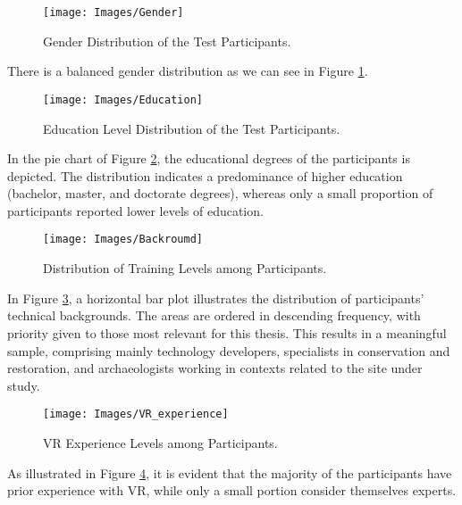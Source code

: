 \begin{figure}[h!]
    \centering
    \texttt{[image: Images/Gender]}
    \caption{Gender Distribution of the Test Participants.} 
    \label{fig:gender}
\end{figure}

There is a balanced gender distribution as we can see in Figure \ref{fig:gender}.

\begin{figure}[h!]
    \centering
    \texttt{[image: Images/Education]}
    \caption{Education Level Distribution of the Test Participants.} 
    \label{fig:education}
\end{figure}

In the pie chart of Figure \ref{fig:education}, the educational degrees of the participants is depicted. 
The distribution indicates a predominance of higher education (bachelor, master, and doctorate degrees), whereas only a small proportion of participants reported lower levels of education.


\begin{figure}[h!]
    \centering
    \texttt{[image: Images/Backroumd]}
    \caption{Distribution of Training Levels among Participants.} 
    \label{fig:background}
\end{figure}

In Figure \ref{fig:background}, a horizontal bar plot illustrates the distribution of participants’ technical backgrounds. 
The areas are ordered in descending frequency, with priority given to those most relevant for this thesis. 
This results in a meaningful sample, comprising mainly technology developers, specialists in conservation and restoration, and archaeologists working in contexts related to the site under study.

\begin{figure}[h!]
    \centering
    \texttt{[image: Images/VR\_experience]}
    \caption{\gls{VR} Experience Levels among Participants.} 
    \label{fig:VR_experience}
\end{figure}

As illustrated in Figure \ref{fig:VR_experience}, it is evident that the majority of the participants have prior experience with \gls{VR}, while only a small portion consider themselves experts.

